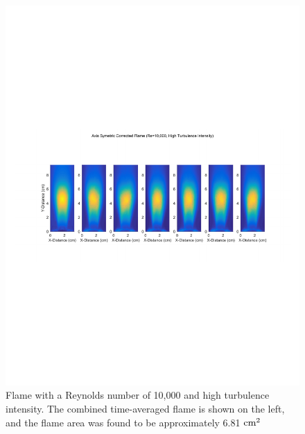 \documentclass[12pt]{ussci} %
\begin{document}
\begin{appendices}
\begin{figure}[ht]
\centering
\includegraphics[width=.95\textwidth]{Re10kHigh.pdf}
\caption{Flame with a Reynolds number of 10,000 and high turbulence intensity.  The combined time-averaged flame is shown on the left, and the flame area was found to be approximately 6.81 $\textnormal{cm}^2$}
\label{fig:10high}
\end{figure}


\end{appendices}
\end{document}
